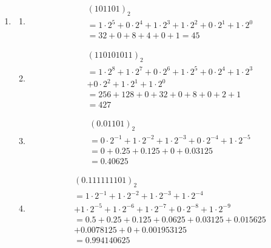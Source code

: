 \documentclass{article}
\begin{document}
\begin{enumerate}
\begin{enumerate}
        E assim segue infinitamente, não existindo representação exata.
\end{enumerate}

\item 
\begin{enumerate}
    \item 
        \begin{align*}
        &(101101)_2 \\
        &= 1\cdot2^5 + 0\cdot2^4 + 1\cdot2^3 + 1\cdot2^2 + 0\cdot2^1 + 1\cdot2^0 \\
        &= 32 + 0 + 8 + 4 + 0 + 1 = 45
        \end{align*}
    \item 
        \begin{align*}
        &(110101011)_2 \\
        &= 1\cdot2^8 +1\cdot2^7 +0\cdot2^6 +1\cdot2^5 + 0\cdot2^4 + 1\cdot2^3 \\
        &+ 0\cdot2^2 + 1\cdot2^1 + 1\cdot2^0 \\
        &= 256 + 128 + 0 + 32 + 0 + 8 + 0 +2 + 1 \\
        &= 427
        \end{align*}
    \item 
        \begin{align*}
        &(0.01101)_2 \\
        &=0\cdot2^{-1} + 1\cdot2^{-2} + 1\cdot2^{-3} + 0\cdot2^{-4} + 1\cdot2^{-5} \\
        &=0 + 0.25 + 0.125 + 0 + 0.03125 \\
        &=0.40625
        \end{align*}
    \item 
        \begin{align*}
        &(0.111111101)_2 \\
        &=1\cdot2^{-1} + 1\cdot2^{-2} + 1\cdot2^{-3} + 1\cdot2^{-4}  \\
        &+ 1\cdot2^{-5} + 1\cdot2^{-6} + 1\cdot2^{-7} + 0\cdot2^{-8} + 1\cdot2^{-9} \\
        &= 0.5 + 0.25 + 0.125 + 0.0625 + 0.03125 + 0.015625 \\
        &+ 0.0078125 + 0 + 0.001953125 \\
        &=0.994140625 
        \end{align*}
\end{enumerate}


\end{enumerate}
\end{document}
